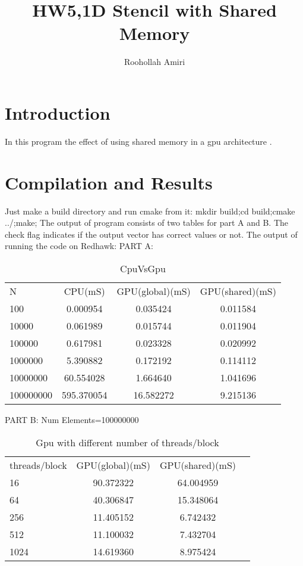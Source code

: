 \documentclass{article}
\begin{document}
\title{HW5,1D Stencil with Shared Memory}
\author{Roohollah Amiri}
\maketitle

\section{Introduction}
In this program the effect of using shared memory in a gpu architecture .

\section{Compilation and Results}

Just make a build directory and run cmake from it: mkdir build;cd build;cmake ../;make;
The output of program consists of two tables for part A and B. The check flag indicates if the output vector has correct values or not.
The output of running the code on Redhawk:
PART A:
\begin{table}[h]
\centering\caption{CpuVsGpu}\label{my-label}
\begin{tabular}{lccc}
N         & CPU(mS)    & GPU(global)(mS) & GPU(shared)(mS) \\
100       & 0.000954   & 0.035424        & 0.011584        \\
10000     & 0.061989   & 0.015744        & 0.011904        \\
100000    & 0.617981   & 0.023328        & 0.020992        \\
1000000   & 5.390882   & 0.172192        & 0.114112        \\
10000000  & 60.554028  & 1.664640        & 1.041696        \\
100000000 & 595.370054 & 16.582272       & 9.215136       
\end{tabular}
\end{table}
PART B: Num Elements=100000000

\begin{table}[h]
\centering\caption{Gpu with different number of threads/block}\label{my-label}
\begin{tabular}{lccc}
threads/block  & GPU(global)(mS) & GPU(shared)(mS)    \\
16             &  90.372322      &  64.004959         \\
64             &  40.306847      &  15.348064         \\
256            &  11.405152      &  6.742432          \\
512            &  11.100032      &  7.432704          \\
1024           &  14.619360      &  8.975424 
\end{tabular}
\end{table}
\end{document}
